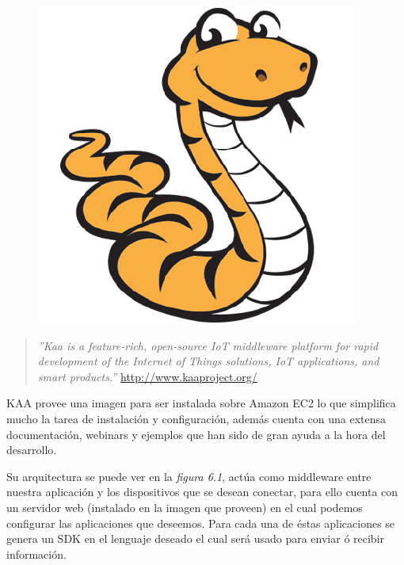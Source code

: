 \begin{figure}[ht]
  \begin{center}
    \includegraphics[scale=0.10]{../images/kaa/logo.png}
    \label{fig:kaalog}
	\end{center}
\end{figure}

\begin{quote}\textit{''Kaa is a feature-rich, open-source IoT middleware platform for rapid development of the Internet of Things solutions, IoT applications, and smart products.''}
\newline
\url{http://www.kaaproject.org/}
\end{quote}

KAA provee una imagen para ser instalada sobre Amazon EC2 lo que simplifica mucho la tarea de instalación y configuración, además cuenta con una extensa documentación, webinars y ejemplos que han sido de gran ayuda a la hora del desarrollo.

Su arquitectura se puede ver en la \textit{figura 6.1}, actúa como middleware entre nuestra aplicación y los dispositivos que se desean conectar, para ello cuenta con un servidor web (instalado en la imagen que proveen) en el cual podemos configurar las aplicaciones que deseemos. Para cada una de éstas aplicaciones se genera un SDK en el lenguaje deseado el cual será usado para enviar ó recibir información.

